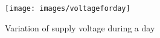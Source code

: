 \begin{figure} 
	\centering
	\texttt{[image: images/voltageforday]}
	\caption[Variation of supply voltage during a day]{Variation of supply voltage during a day}
	\label{fig:voltageforday}
	\vspace*{-3ex}
\end{figure}
